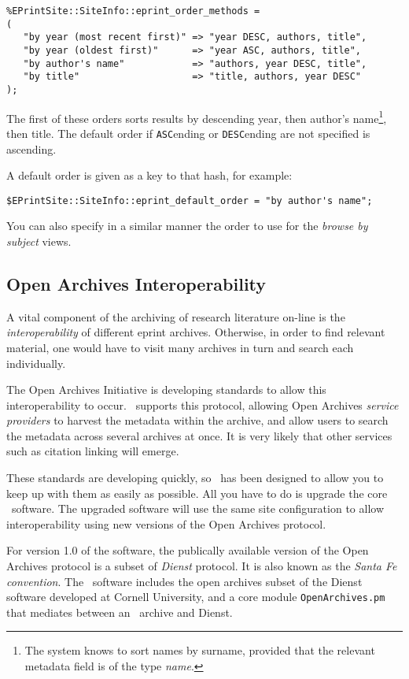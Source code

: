 \begin{verbatim}
%EPrintSite::SiteInfo::eprint_order_methods =
(
   "by year (most recent first)" => "year DESC, authors, title",
   "by year (oldest first)"      => "year ASC, authors, title",
   "by author's name"            => "authors, year DESC, title",
   "by title"                    => "title, authors, year DESC"
);
\end{verbatim}

The first of these orders sorts results by descending year, then author's name\footnote{The system knows to sort names by surname, provided that the relevant metadata field is of the type \emph{name}.}, then title. The default order if {\tt ASC}ending or {\tt DESC}ending are not specified is ascending.

A default order is given as a key to that hash, for example:

\begin{verbatim}
$EPrintSite::SiteInfo::eprint_default_order = "by author's name";
\end{verbatim}

You can also specify in a similar manner the order to use for the \emph{browse by subject} views.


\subsection{Open Archives Interoperability}

A vital component of the archiving of research literature on-line is the \emph{interoperability} of different eprint archives. Otherwise, in order to find relevant material, one would have to visit many archives in turn and search each individually.

The Open Archives Initiative is developing standards to allow this interoperability to occur. \eprints\ supports this protocol, allowing Open Archives \emph{service providers} to harvest the metadata within the archive, and allow users to search the metadata across several archives at once. It is very likely that other services such as citation linking will emerge.

These standards are developing quickly, so \eprints\ has been designed to allow you to keep up with them as easily as possible. All you have to do is upgrade the core \eprints\ software. The upgraded software will use the same site configuration to allow interoperability using new versions of the Open Archives protocol.

For version 1.0 of the software, the publically available version of the Open Archives protocol is a subset of \emph{Dienst} protocol. It is also known as the \emph{Santa Fe convention}. The \eprints\ software includes the open archives subset of the Dienst software developed at Cornell University, and a core module {\tt OpenArchives.pm} that mediates between an \eprints\ archive and Dienst.

